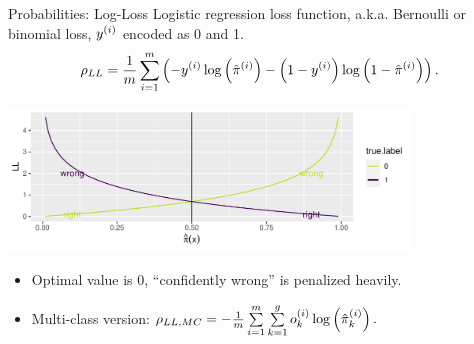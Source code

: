 \documentclass[11pt,compress,t,notes=noshow, xcolor=table]{beamer}
\begin{document}

\begin{vbframe}{Probabilities: Log-Loss}
Logistic regression loss function, a.k.a. Bernoulli or binomial loss, $y^{(i)}$ 
encoded as 0 and 1.
$$\rho_{LL} = \frac{1}{m} \sum_{i = 1}^m \left( - y^{(i)} \log \left( 
\hat \pi^{(i)} \right) - \left( 1-y^{(i)} \right) \log \left( 1 - \hat \pi^{(i)} 
\right) \right).$$
\begin{knitrout}\scriptsize
{}\color{fgcolor}

{\centering \includegraphics[width=0.8\textwidth]{figure/eval_mclass_2}  

}

\end{knitrout}
\begin{itemize}
  \item Optimal value is 0, \enquote{confidently wrong} is penalized heavily.
  \item Multi-class version: $\rho_{LL, MC} = 
  - \frac{1}{m} \sum\limits_{i = 1}^m \sum\limits_{k=1}^g o_k^{(i)} \log \left( 
  \hat \pi_k^{(i)} \right).$
\end{itemize}
\end{vbframe}


\endlecture
\end{document}
